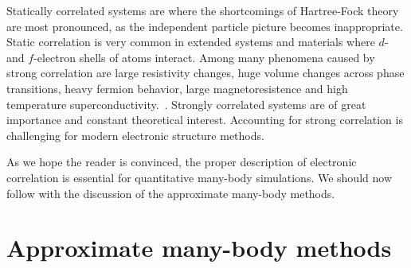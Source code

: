 Statically correlated systems are where the shortcomings of Hartree-Fock theory 
are most pronounced, as the independent particle picture becomes inappropriate. 
Static correlation is very common in extended systems and materials 
where $d$- and $f$-electron shells of atoms interact. Among many phenomena 
caused by strong correlation are large resistivity changes, huge volume changes 
across phase transitions, heavy fermion behavior, large 
magnetoresistence and high temperature superconductivity.~\cite{imada1998metal, 
kotliar2004strongly}. Strongly correlated systems are of great importance and 
constant theoretical interest. Accounting for strong correlation is challenging 
for modern electronic structure methods.

As we hope the reader is convinced, the proper description of electronic 
correlation is essential for quantitative many-body simulations. We should now 
follow with the discussion of the approximate many-body methods.

\section{Approximate many-body methods
\label{sec:approx_methods}}
